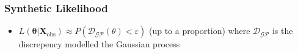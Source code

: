 \documentclass{beamer}
\begin{document}
\begin{frame}
    \frametitle{Synthetic Likelihood}
    \begin{itemize}
        \item $L(\bm\theta | \mathbf{X}_\text{obs}) \approx P(\mathcal{D}_{\mathcal{GP}}(\theta) < \varepsilon)$ (up to a proportion) where $\mathcal{D}_{\mathcal{GP}}$ is the discrepency modelled the Gaussian process


    \end{itemize}
\end{frame}
\end{document}
